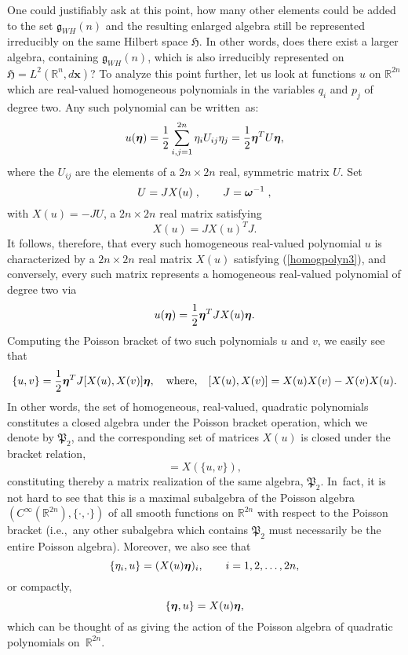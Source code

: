 \documentclass[11pt]{amsart}
\numberwithin{equation}{section}
\theoremstyle{remark}
\newcommand\HH{\mathfrak H}
\newcommand\RR{\mathbb R}
\newcommand{\be}{\begin{equation}}
\newcommand{\en}{\end{equation}}
\newcommand{\bomega}{\mbox{\boldmath $\omega$}}
\newcommand{\bfeta}{\mbox{\boldmath $\eta$}}
\newcommand{\bx}{\mathbf x}
\begin{document}
One could justifiably ask at this point, how many other elements
could be added to the set ${\mathfrak g}_{WH}(n)$ and the
resulting enlarged algebra still be represented irreducibly on the
same Hilbert space $\HH$. In other words, does there exist a larger
algebra, containing ${\mathfrak g}_{WH}(n)$, which is also irreducibly
represented on $\HH = L^{2}({\mathbb R}^{n}, d\bx )$? To analyze this
point further, let us look at functions
$u$ on ${\mathbb R}^{2n}$ which are real-valued homogeneous polynomials in the
variables $q_i$ and $p_j$ of degree two. Any such polynomial can be written~as:
\be
   u(\bfeta ) = \frac 12 \sum_{i,j = 1}^{2n}\eta_i U_{ij}\eta_j
        = \frac 12 \bfeta^{T}U\bfeta ,
\label{homogpolyn1}
\en
where the $U_{ij}$ are the elements of a $2n\times 2n$ real, symmetric matrix
$U$. Set
\be
     U = JX(u)\; , \qquad J = \bomega^{-1}\; ,
\label{homogpolyn2}
\en
with $X(u) = -JU$, a $2n\times 2n$ real matrix satisfying
\be
    X(u) = JX(u)^{T}J.
\label{homogpolyn3}
\en
It follows, therefore, that every such homogeneous real-valued
polynomial $u$ is characterized
by a $2n\times 2n$ real matrix  $X(u)$ satisfying (\ref{homogpolyn3}),
and conversely, every such matrix represents a homogeneous
real-valued
polynomial of degree two via
\be
    u(\bfeta )= \frac 12 \bfeta^{T}JX(u)\bfeta .
\label{homogpolyn4}
\en
Computing the Poisson bracket of two such polynomials $u$ and $v$, we easily
see that
\be
  \{u ,v\} = \frac 12 \bfeta^{T}J[X(u), X(v)]\bfeta,
\quad \mbox{\rm where,} \quad [X(u), X(v)] = X(u)X(v)- X(v)X(u).
\label{homogpolyn5}
\en
In other words, the set of homogeneous, real-valued, quadratic polynomials
constitutes a closed algebra under the Poisson bracket operation, which we
denote by ${\mathfrak P}_2$, and the corresponding set of matrices $X(u)$ is
closed under the bracket relation,
\be
  [X(u), X(v)] = X(\{u, v\}),
\label{homogpolyn6}
\en
constituting thereby a matrix realization of the same algebra,
${\mathfrak P}_2$. In~fact, it is not hard to see that this is a maximal
subalgebra of the Poisson algebra $(C^\infty(\RR^{2n}),\{\cdot,\cdot\})$
of all smooth functions on $\RR^{2n}$ with respect to the Poisson bracket
(i.e.,~any other subalgebra which contains ${\mathfrak P}_2$ must necessarily
be the entire Poisson algebra). Moreover, we also see that
\be
  \{\eta_i, u\} = (X(u)\bfeta)_i, \qquad i=1,2, \ldots , 2n,
\label{semidirprod1}
\en
or compactly,
\be
   \{\bfeta, u\} = X(u)\bfeta,
\label{semidirprod2}
\en
which can be thought of as giving the action of the Poisson algebra of
quadratic polynomials on~${\mathbb R}^{2n}$.
\end{document}
